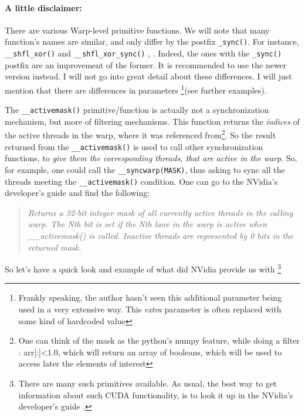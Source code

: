 \paragraph{A little disclaimer: }There are various Warp-level primitive functions. We will note that many function's
names are similar, and only differ by the postfix \verb|_sync()|. For instance, 
\verb|__shfl_xor()| and \verb|__shfl_xor_sync()| \cite{chinese_sync}, \cite{conference_gpu}. Indeed, the ones with the \verb|_sync()|
postfix are an improvement of the former. It is recommended to use the newer version instead.
I will not go into great detail about these differences. 
I will just mention that there are differences in parameters
\footnote{Frankly speaking, the author hasn't seen this additional parameter 
being used in a very extensive way. This \textit{extra} parameter is often replaced with 
some kind of hardcoded value}(see further examples).


The \verb|__activemask()| primitive/function is actually not a synchronization 
mechanism, but more of filtering mechanisms. This function returns the \textit{indices}
of the active threads in the warp, where it was referenced from\footnote{One can think 
of the mask as the python's numpy feature, while doing a filter : {\selectfont arr[:]<1.0}, which 
will return an array of booleans, which will be used to access later the elements of interest}. 
So the result returned from the \verb|__activemask()| is used to call other synchronization functions, 
to \textit{give them the corresponding threads, that are active in the warp}.
So, for example, one could call the  \verb|__syncwarp(MASK)|, thus asking 
to sync all the threads meeting the \verb|__activemask()| condition. 
One can go to the NVidia's developer's guide \cite{center} and find the following:

\begin{quote}
    \textsl{
Returns a 32-bit integer mask of all currently active threads in the calling warp. 
The Nth bit is set if the Nth lane in the warp is active when \_\_activemask() is called. 
Inactive threads are represented by 0 bits in the returned mask.
    }
\end{quote}

So let's have a quick look and example of what did NVidia provide us with 
\footnote{There are many such primitives available. As usual, the best way to get information about such 
CUDA functionality, is to look it up in the NVidia's developer's guide \cite{center}.}

